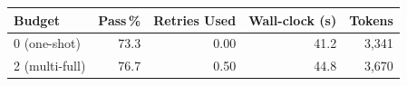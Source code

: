 \footnotesize
\begin{tabular}{@{}lrrrr@{}}
\toprule
Budget & Pass\,\% & Retries Used & Wall-clock (s) & Tokens \\
\midrule
0 (one-shot)  & 73.3 & 0.00 & 41.2 & 3{,}341 \\
2 (multi-full) & 76.7 & 0.50 & 44.8 & 3{,}670 \\
\bottomrule
\end{tabular}

